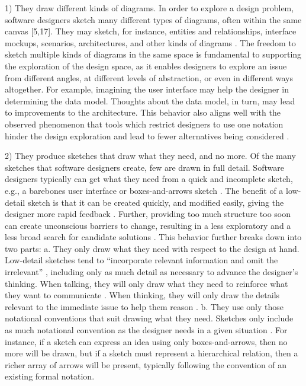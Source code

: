 1)	They draw different kinds of diagrams. In order to explore a design problem, software designers sketch many different types of diagrams, often within the same canvas [5,17]. They may sketch, for instance, entities and relationships, interface mockups, scenarios, architectures, and other kinds of diagrams \cite{cherubini2007let}. The freedom to sketch multiple kinds of diagrams in the same space is fundamental to supporting the exploration of the design space, as it enables designers to explore an issue from different angles, at different levels of abstraction, or even in different ways altogether. For example, imagining the user interface may help the designer in determining the data model. Thoughts about the data model, in turn, may lead to improvements to the architecture. This behavior also aligns well with the observed phenomenon that tools which restrict designers to use one notation hinder the design exploration and lead to fewer alternatives being considered \cite{shipman1999incremental}. 

2)	They produce sketches that draw what they need, and no more. Of the many sketches that software designers create, few are drawn in full detail. Software designers typically can get what they need from a quick and incomplete sketch, e.g., a barebones user interface or boxes-and-arrows sketch \cite{virzi1996usability}. The benefit of a low-detail sketch is that it can be created quickly, and modified easily, giving the designer more rapid feedback \cite{cherubini2007let,petre2009insights}. Further, providing too much structure too soon can create unconscious barriers to change, resulting in a less exploratory and a less broad search for candidate solutions \citep{wong1992rough}. This behavior further breaks down into two parts:
a.	They only draw what they need with respect to the design at hand. Low-detail sketches tend to “incorporate relevant information and omit the irrelevant” \cite{tversky2002sketches}, including only as much detail as necessary to advance the designer’s thinking. When talking, they will only draw what they need to reinforce what they want to communicate \cite{petre2009insights}. When thinking, they will only draw the details relevant to the immediate issue to help them reason \citep{dekel2007notation}.
b.	They use only those notational conventions that suit drawing what they need. Sketches only include as much notational convention as the designer needs in a given situation \cite{petre2009insights}. For instance, if a sketch can express an idea using only boxes-and-arrows, then no more will be drawn, but if a sketch must represent a hierarchical relation, then a richer array of arrows will be present, typically following the convention of an existing formal notation.

